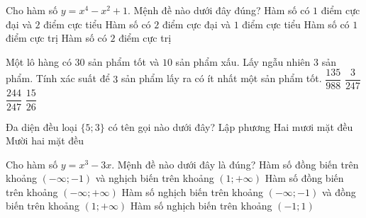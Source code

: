 \begin{ex}%
Cho hàm số $y=x^4-x^2+1$. Mệnh đề nào dưới đây đúng?
\choice
{\True Hàm số có $1$ điểm cực đại và $2$ điểm cực tiểu}
{Hàm số có $2$ điểm cực đại và $1$ điểm cực tiểu}
{Hàm số có $1$ điểm cực trị}
{Hàm số có $2$ điểm cực trị}
\end{ex}

\begin{ex}%
Một lô hàng có $30$ sản phẩm tốt và $10$ sản phẩm xấu. Lấy ngẫu nhiên $3$ sản phẩm. Tính xác suất để $3$ sản phẩm lấy ra có ít nhất một sản phẩm tốt.
\choice
{$\dfrac{135}{988}$}
{$\dfrac{3}{247}$}
{\True $\dfrac{244}{247}$}
{$\dfrac{15}{26}$}
\end{ex}

\begin{ex}%
Đa diện đều loại $\{5;3\}$ có tên gọi nào dưới đây?
{Lập phương}
{Hai mươi mặt đều}
{\True Mười hai mặt đều}
\end{ex}

\begin{ex}%
	Cho hàm số $y={{x}^{3}}-3x$. Mệnh đề nào dưới đây là đúng?
	\choice
	{ Hàm số đồng biến trên khoảng $\left( -\infty ;-1 \right)$ và nghịch biến trên khoảng $\left( 1;+\infty  \right)$}
	{ Hàm số đồng biến trên khoảng $\left( -\infty ;+\infty  \right)$}
	{ Hàm số nghịch biến trên khoảng $\left( -\infty ;-1 \right)$ và đồng biến trên khoảng $\left( 1;+\infty  \right)$}
	{ \True  Hàm số nghịch biến trên khoảng $\left( -1;1 \right)$}
	\end{ex}
	
